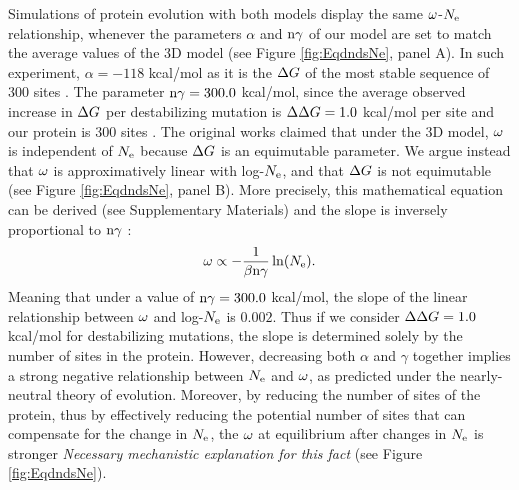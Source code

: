 \documentclass{article}
\begin{document}
Simulations of protein evolution with both models display the same $\omega$-$N_{\mathrm{e}}$ relationship, whenever the parameters $\alpha$ and $\text{n} \gamma$ of our model are set to match the average values of the $3$D model (see Figure \ref{fig:EqdndsNe}, panel A).
In such experiment, $\alpha=-118$ kcal/mol as it is the $\Delta G$ of the most stable sequence of $300$ sites \cite{Goldstein2011}.
The parameter $\text{n} \gamma=300.0$ kcal/mol, since the average observed increase in $\Delta G$ per destabilizing mutation is $\Delta \Delta G = 1.0$ kcal/mol per site and our protein is $300$ sites \cite{Zeldovich2007}.
The original works claimed that under the $3$D model, $\omega$ is independent of $N_{\mathrm{e}}$ because $\Delta G$ is an equimutable parameter.
We argue instead that $\omega$ is approximatively linear with log-$N_{\mathrm{e}}$, and that $\Delta G$ is not equimutable (see Figure \ref{fig:EqdndsNe}, panel B).
More precisely, this mathematical equation can be derived (see Supplementary Materials) and the slope is inversely proportional to $\text{n} \gamma$ :
\begin{equation}
\omega \propto -\dfrac{1}{\beta \text{n} \gamma} \ln(N_{\mathrm{e}}).
\end{equation}
Meaning that under a value of $\text{n} \gamma=300.0$ kcal/mol, the slope of the linear relationship between $\omega$ and log-$N_{\mathrm{e}}$ is $0.002$.
Thus if we consider $\Delta \Delta G = 1.0$ kcal/mol for destabilizing mutations, the slope is determined solely by the number of sites in the protein. 
However, decreasing both $\alpha$ and $\gamma$ together implies a strong negative relationship between $N_{\mathrm{e}}$ and $\omega$, as predicted under the nearly-neutral theory of evolution.
Moreover, by reducing the number of sites of the protein, thus by effectively reducing the potential number of sites that can compensate for the change in $N_{\mathrm{e}}$, the $\omega$ at equilibrium after changes in $N_{\mathrm{e}}$ is stronger \textit{Necessary mechanistic explanation for this fact} (see Figure \ref{fig:EqdndsNe}).
\end{document}
